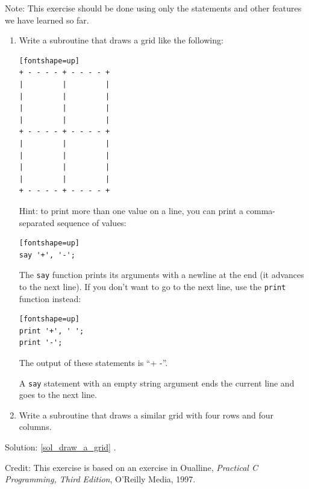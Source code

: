 \begin{exercise}
\label{draw_a_grid}

Note: This exercise should be
done using only the statements and other features we 
have learned so far.  

\begin{enumerate}

\item Write a subroutine that draws a grid like the following:

\begin{verbatim}[fontshape=up]
+ - - - - + - - - - +
|         |         |
|         |         |
|         |         |
|         |         |
+ - - - - + - - - - +
|         |         |
|         |         |
|         |         |
|         |         |
+ - - - - + - - - - +
\end{verbatim}
%
Hint: to print more than one value on a line, you can print
a comma-separated sequence of values:

\begin{verbatim}[fontshape=up]
say '+', '-';
\end{verbatim}
%
The {\tt say} function prints its arguments with a newline at the end (it advances to the next line). If you don't want to 
go to the next line, use the {\tt print} function instead:


\begin{verbatim}[fontshape=up]
print '+', ' ';
print '-';
\end{verbatim}
%
The output of these statements is ``+ -''.

A {\tt say} statement with an empty string argument ends 
the current line and goes to the next line.

\item Write a subroutine that draws a similar grid
with four rows and four columns.

\end{enumerate}

Solution: \ref{sol_draw_a_grid}
.

Credit: This exercise is based on an exercise in Oualline, {\em
    Practical C Programming, Third Edition}, O'Reilly Media, 1997.

\end{exercise}

